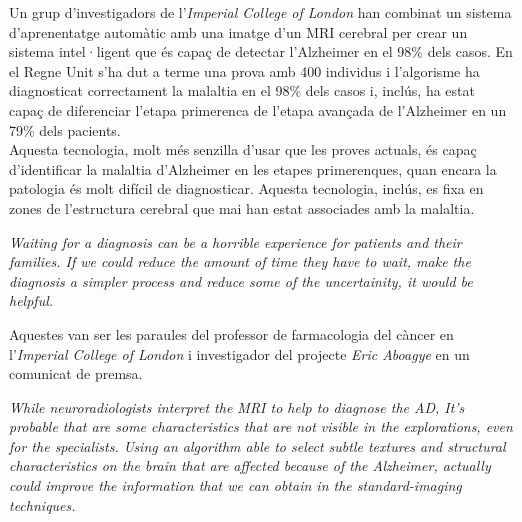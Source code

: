 \documentclass[a4paper,12pt]{report}
\begin{document}
\begin{center}
    \begin{minipage}{0.9\linewidth}
        \vspace{5pt}
        {\small
            Un grup d'investigadors de l'\textit{Imperial College of London} han combinat un sistema d'aprenentatge automàtic amb una imatge d'un MRI cerebral per crear un sistema intel·ligent que és capaç de detectar l'Alzheimer en el 98\% dels casos. En el Regne Unit s'ha dut a terme una prova amb 400 individus i l'algorisme ha diagnosticat correctament la malaltia en el 98\% dels casos i, inclús, ha estat capaç de diferenciar l'etapa primerenca de l'etapa avançada de l'Alzheimer en un 79\% dels pacients.\\
            Aquesta tecnologia, molt més senzilla d'usar que les proves actuals, és capaç d'identificar la malaltia d'Alzheimer en les etapes primerenques, quan encara la patologia és molt difícil de diagnosticar. Aquesta tecnologia, inclús, es fixa en zones de l'estructura cerebral que mai han estat associades amb la malaltia.\\
            \begin{center}
                \begin{minipage}{0.9\linewidth}
                    \vspace{5pt}
                    {\small \textit{Waiting for a diagnosis can be a horrible experience for patients and their families. If we could reduce the amount of time they have to wait, make the diagnosis a simpler process and reduce some of the uncertainity, it would be helpful.}
                    }
                    \vspace{20pt}
                \end{minipage}
            \end{center}
            Aquestes van ser les paraules del professor de farmacologia del càncer en l'\textit{Imperial College of London} i investigador del projecte \textit{Eric Aboagye} en un comunicat de premsa.\\
            \begin{center}
                \begin{minipage}{0.9\linewidth}
                    \vspace{5pt}
                    {\small \textit{While neuroradiologists interpret the MRI to help to diagnose the AD, It's probable that are some characteristics that are not visible in the explorations, even for the specialists. Using an algorithm able to select subtle textures and structural characteristics on the brain that are affected because of the Alzheimer, actually could improve the information that we can obtain in the standard-imaging techniques.}
}
\end{minipage}
\end{center}}
\end{minipage}
\end{center}
\end{document}
